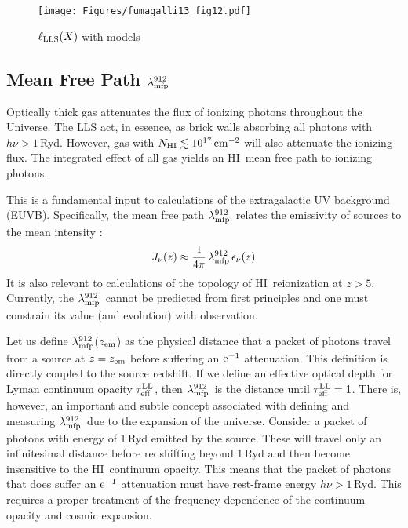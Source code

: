 \documentclass[graybox]{svmult}
\newcommand{\HI}{H{\sc I}}
\newcommand{\mnhi}{N_{\rm HI}}
\def\cm#1{\, {\rm cm^{#1}}}
\def\mlmfp{\lambda_{\rm mfp}^{912}}
\def\lmfp{$\mlmfp$}
\def\mtll{\tau_{\rm eff}^{\rm LL}}
\def\tll{$\mtll$}
\begin{document}
%
\begin{figure}[b]
\sidecaption
\texttt{[image: Figures/fumagalli13\_fig12.pdf]}
%
%
\caption{$\ell_{\rm LLS}(X)$ with models
}
\label{fig:f13_fig12}       %
\end{figure}

\subsection{Mean Free Path \lmfp}

Optically thick gas attenuates the flux of ionizing
photons throughout the Universe.  The LLS act, in essence,
as brick walls absorbing all photons with $h \nu > 1$\,Ryd.
However, gas with $\mnhi \lesssim 10^{17} \cm{-2}$ will
also attenuate the ionizing flux.
The integrated effect of all gas yields an \HI\ mean
free path to ionizing photons.  

This is a fundamental
input to calculations of the extragalactic UV background (EUVB).
Specifically, the mean free path \lmfp\ 
relates the emissivity of sources to the mean intensity
\cite{hm96,flz+09}:
\begin{equation}
J_\nu(z) \approx \frac{1}{4 \pi} \, \mlmfp \, \epsilon_\nu(z)
\end{equation}
It is also relevant to calculations of the topology
of \HI\ reionization at $z>5$.
Currently, the \lmfp\
cannot be predicted from first principles
and one must constrain its value (and evolution)
with observation.

Let us define
\lmfp($z_{\rm em}$) as the physical distance that
a packet of photons travel from a source at $z=z_{\rm em}$
before suffering an $\rm e^{-1}$ attenuation.
This definition is directly coupled to the source redshift.
If we define an effective optical depth for Lyman
continuum opacity \tll, then \lmfp\ is the distance until 
$\mtll = 1$.
There is, however, an important and subtle concept associated
with defining and measuring \lmfp\ due to the expansion of the
universe.  Consider a packet of photons with energy of 1\,Ryd
emitted by the source.
These will travel only an infinitesimal distance before
redshifting beyond 1\,Ryd and then become insensitive to the
\HI\ continuum opacity.  This means that the packet of photons
that does suffer an $\rm e^{-1}$ attenuation must have rest-frame
energy $h\nu > 1$\,Ryd.  This requires a proper treatment of
the frequency dependence of the continuum opacity and cosmic
expansion.
\end{document}
